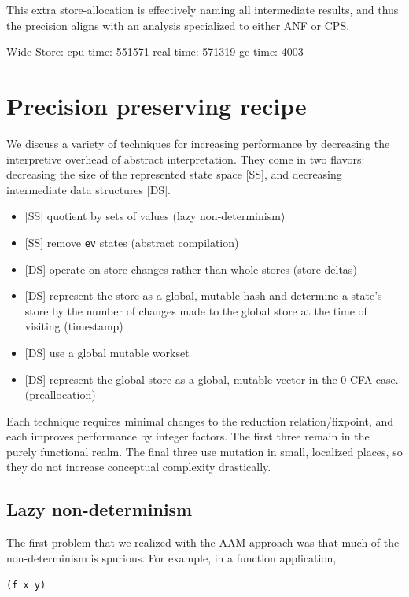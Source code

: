\documentclass[preprint,onecolumn,9pt]{sigplanconf} %
\begin{document}
This extra store-allocation is effectively naming all intermediate
results, and thus the precision aligns with an analysis specialized to
either ANF or CPS.

Wide Store: cpu time: 551571 real time: 571319 gc time: 4003

\section{Precision preserving recipe}
\label{sec:opt}

We discuss a variety of techniques for increasing performance by
decreasing the interpretive overhead of abstract interpretation. They
come in two flavors: decreasing the size of the represented state
space [SS], and decreasing intermediate data structures [DS].

\begin{itemize}
 \item{[SS] quotient by sets of values (lazy non-determinism)}
 \item{[SS] remove {\tt ev} states (abstract compilation)}
 \item{[DS] operate on store changes rather than whole stores (store deltas)}
 \item{[DS] represent the store as a global, mutable hash and
   determine a state's store by the number of changes made to the
   global store at the time of visiting (timestamp)}
 \item{[DS] use a global mutable workset}
 \item{[DS] represent the global store as a global, mutable vector in
   the 0-CFA case. (preallocation)}
\end{itemize}
Each technique requires minimal changes to the reduction
relation/fixpoint, and each improves performance by integer
factors. The first three remain in the purely functional realm. The
final three use mutation in small, localized places, so they do not
increase conceptual complexity drastically.

\subsection{Lazy non-determinism}

The first problem that we realized with the AAM approach was that much
of the non-determinism is spurious. For example, in a function
application,
\begin{center}{\tt (f x y)}\end{center}
\end{document}
